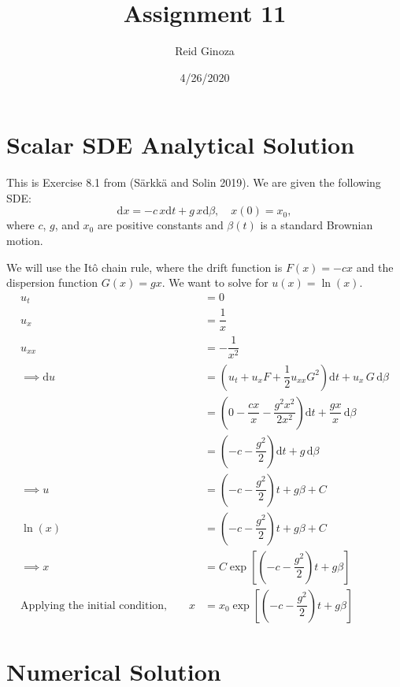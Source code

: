 \documentclass[]{article}
\title{Assignment 11}
\author{Reid Ginoza}
\date{4/26/2020}
\begin{document}
\maketitle

\hypertarget{scalar-sde-analytical-solution}{%
\section{Scalar SDE Analytical
Solution}\label{scalar-sde-analytical-solution}}

This is Exercise 8.1 from (Särkkä and Solin 2019). We are given the
following SDE: \begin{equation}
\mathrm{d}x = -c \, x \mathrm{d}t + g \, x \mathrm{d}\beta, \quad x(0) = x_0,
\end{equation} where \(c\), \(g\), and \(x_0\) are positive constants
and \(\beta (t)\) is a standard Brownian motion.

We will use the Itô chain rule, where the drift function is
\(F(x) = -cx\) and the dispersion function \(G(x) = gx\). We want to
solve for \(u(x) = \ln{\left( x\right)}\). \begin{align}
u_t &= 0\\
u_x &= \dfrac{1}{x}\\
u_{xx} &= - \dfrac{1}{x^2}\\
\implies \mathrm{d}u &= \left(u_t + u_x F + \dfrac{1}{2} u_{xx} G^2 \right) \mathrm{d}t + u_x \,G \,\mathrm{d}\beta\\
&=\left(0 - \dfrac{cx}{x} - \dfrac{g^2 x^2}{2x^2} \right) \mathrm{d}t + \dfrac{gx}{x} \, \mathrm{d}\beta\\
&=\left(- c - \dfrac{g^2}{2} \right) \mathrm{d}t + g \, \mathrm{d}\beta\\
\implies u &= \left(- c - \dfrac{g^2}{2} \right) t + g \beta + C\\
\ln{\left( x \right)} &= \left(- c - \dfrac{g^2}{2} \right) t + g \beta + C\\
\implies x &= C \exp{\left[ \left(- c - \dfrac{g^2}{2} \right) t + g \beta \right]}\\
\text{Applying the initial condition,}\quad\quad x &= x_0 \exp{\left[ \left(- c - \dfrac{g^2}{2} \right) t + g \beta \right]}
\end{align}

\hypertarget{numerical-solution}{%
\section{Numerical Solution}\label{numerical-solution}}
\end{document}
